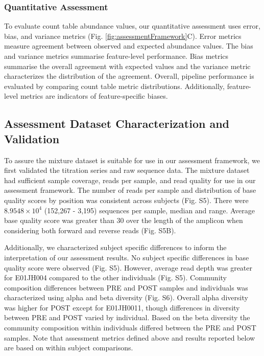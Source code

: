 \documentclass{bmcart}
\begin{document}
\subsubsection*{Quantitative Assessment}
To evaluate count table abundance values, our quantitative assessment uses error, bias, and variance metrics (Fig. \ref{fig:assessmentFramework}C).
Error metrics measure agreement between observed and expected abundance values.
The bias and variance metrics summarise feature-level performance. 
Bias metrics summarise the overall agreement with expected values and the variance metric characterizes the distribution of the agreement.
Overall, pipeline performance is evaluated by comparing count table metric distributions.
Additionally, feature-level metrics are indicators of feature-specific biases.

\subsection*{Assessment Dataset Characterization and Validation}
To assure the mixture dataset is suitable for use in our assessment framework, we first validated the titration series and raw sequence data.
The mixture dataset had sufficient sample coverage, reads per sample, and read quality for use in our assessment framework. 
The number of reads per sample and distribution of base quality scores by position was consistent across subjects (Fig. S5).
There were \(8.9548\times 10^{4}\) (152,267 - 3,195) sequences per sample, median and
range. Average base quality score was greater than 30 over the length of the amplicon when considering both forward and reverse reads (Fig. S5B).

Additionally, we characterized subject specific differences to inform the interpretation of our assessment results.
No subject specific differences in base quality score were observed (Fig. S5). However, average read depth was greater for E01JH004 compared to the other individuals (Fig. S5).
Community composition differences between PRE and POST samples and individuals was characterized using alpha and beta diversity (Fig. S6). 
Overall alpha diversity was higher for POST except for E01JH0011, 
though differences in diversity between PRE and POST varied by individual. 
Based on the beta diversity the community composition within individuals differed between the PRE and POST samples. Note that assessment metrics defined above and results reported below are based on within subject comparisons.
\end{document}
